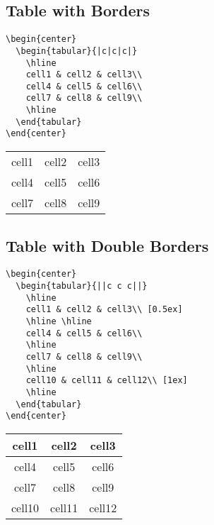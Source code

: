 \documentclass[10pt, letterpaper]{article}
\begin{document}
\subsection{Table with Borders}
\begin{multicols}{2}
\lstset{style=basicstyle}
\begin{lstlisting}[]
\begin{center}
  \begin{tabular}{|c|c|c|}
    \hline
    cell1 & cell2 & cell3\\
    cell4 & cell5 & cell6\\
    cell7 & cell8 & cell9\\
    \hline
  \end{tabular}
\end{center}
\end{lstlisting}
\columnbreak
\begin{center}
  \begin{tabular}{|c|c|c|}
    \hline
    cell1 & cell2 & cell3\\
    cell4 & cell5 & cell6\\
    cell7 & cell8 & cell9\\
    \hline
  \end{tabular}
\end{center}
\end{multicols}

\subsection{Table with Double Borders}
\begin{multicols}{2}
\lstset{style=basicstyle}
\begin{lstlisting}[]
\begin{center}
  \begin{tabular}{||c c c||}
    \hline
    cell1 & cell2 & cell3\\ [0.5ex]
    \hline \hline
    cell4 & cell5 & cell6\\
    \hline
    cell7 & cell8 & cell9\\
    \hline
    cell10 & cell11 & cell12\\ [1ex]
    \hline
  \end{tabular}
\end{center}
\end{lstlisting}
\begin{center}
  \begin{tabular}{||c c c||}
    \hline
    cell1 & cell2 & cell3\\ [0.5ex]
    \hline \hline
    cell4 & cell5 & cell6\\
    \hline
    cell7 & cell8 & cell9\\
    \hline
    cell10 & cell11 & cell12\\ [1ex]
    \hline
  \end{tabular}
\end{center}
\end{multicols}
\end{document}
